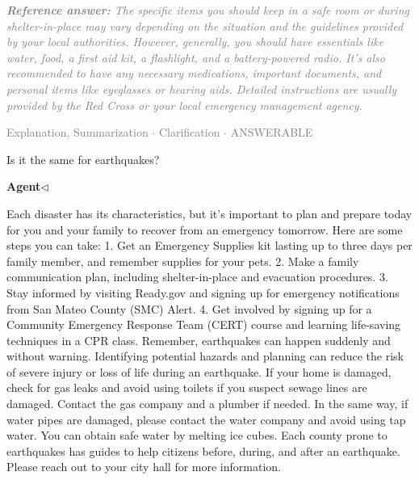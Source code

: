 \documentclass[a4paper,11pt]{article}
\begin{document}
\begin{refanswerenv}
{\footnotesize\textit{\textcolor{gray}{\textbf{Reference answer:}\enspace 
The specific items you should keep in a safe room or during shelter-in-place may vary depending on the situation and the guidelines provided by your local authorities. However, generally, you should have essentials like water, food, a first aid kit, a flashlight, and a battery-powered radio. It's also recommended to have any necessary medications, important documents, and personal items like eyeglasses or hearing aids. Detailed instructions are usually provided by the Red Cross or your local emergency management agency.}}}
\end{refanswerenv}
\vspace{0.5em}
\hfill{\tiny\textcolor{gray}{Explanation, Summarization $\cdot$ Clarification $\cdot$ ANSWERABLE}}
\begin{userbubble}
Is it the same for earthquakes?
\end{userbubble}
\noindent\hfill{\small\textcolor{agentcolor}{\textbf{Agent\enspace$\triangleleft$}}}
\begin{agentbubble}
Each disaster has its characteristics, but it's important to plan and prepare today for you and your family to recover from an emergency tomorrow. Here are some steps you can take: 1. Get an Emergency Supplies kit lasting up to three days per family member, and remember supplies for your pets. 2. Make a family communication plan, including shelter-in-place and evacuation procedures. 3. Stay informed by visiting Ready.gov and signing up for emergency notifications from San Mateo County (SMC) Alert. 4. Get involved by signing up for a Community Emergency Response Team (CERT) course and learning life-saving techniques in a CPR class. Remember, earthquakes can happen suddenly and without warning. Identifying potential hazards and planning can reduce the risk of severe injury or loss of life during an earthquake. If your home is damaged, check for gas leaks and avoid using toilets if you suspect sewage lines are damaged. Contact the gas company and a plumber if needed. In the same way, if water pipes are damaged, please contact the water company and avoid using tap water. You can obtain safe water by melting ice cubes. Each county prone to earthquakes has guides to help citizens before, during, and after an earthquake. Please reach out to your city hall for more information.
\end{agentbubble}
\end{document}
